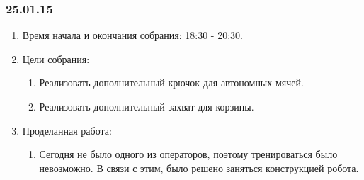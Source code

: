 \subsubsection{25.01.15}
\begin{enumerate}
	
	\item Время начала и окончания собрания: 18:30 - 20:30.
	
	\item Цели собрания: 
	\begin{enumerate}
		
		\item Реализовать дополнительный крючок для автономных мячей.
		
		\item Реализовать дополнительный захват для корзины.
		
	\end{enumerate}

	\item Проделанная работа:
	\begin{enumerate}
		
		\item Сегодня не было одного из операторов, поэтому тренироваться было невозможно. В связи с этим, было решено заняться конструкцией робота.
		

\end{enumerate}
\end{enumerate}
